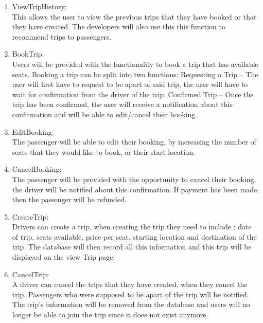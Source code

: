 \documentclass[hidelinks, 12pt, a4paper]{article}
\begin{document}
\begin{enumerate}[label=U1.\arabic*]

      \item ViewTripHistory:\\
            This allows the user to view the previous trips that they have booked or that they have created. The developers will also use this this function to recommend trips to passengers.\\

      \item BookTrip:\\
            Users will be provided with the functionality to book a trip that has available seats. Booking a trip can be split into two functions:
            Requesting a Trip – The user will first have to request to be apart of said trip, the user will have to wait for confirmation from the driver of the trip.
            Confirmed Trip – Once the trip has been confirmed, the user will receive a notification about this confirmation and will be able to edit/cancel their booking.\\

      \item EditBooking:\\
            The passenger will be able to edit their booking, by increasing the number of seats that they would like to book, or their start location.\\

      \item CancelBooking: \\
            The passenger will be provided with the opportunity to cancel their booking, the driver will be notified about this confirmation. If payment has been made, then the passenger will be refunded.\\

      \item CreateTrip:\\
            Drivers can create a  trip, when creating the trip they need to include : date of trip, seats available, price per seat, starting location and destination of the trip. The database will then record all this information and this trip will be displayed on the view Trip page.\\

      \item CancelTrip:\\
            A driver can cancel the trips that they have created, when they cancel the trip. Passengers who were supposed to be apart of the trip will be notified. The trip’s information will be removed from the database and users will no longer be able to join the trip since it does not exist anymore.\\


\end{enumerate}
\end{document}

